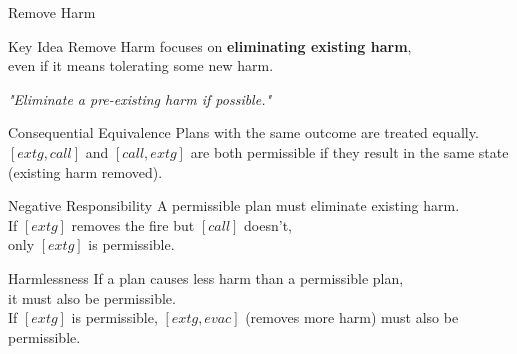 \documentclass[compress,xcolor=table]{beamer}
\begin{document}
\begin{frame}{Remove Harm}
    \begin{block}{Key Idea}
        Remove Harm focuses on \textbf{eliminating existing harm}, \\
        even if it means tolerating some new harm. \\
        \begin{center}
            \textit{"Eliminate a pre-existing harm if possible."}
        \end{center}
    \end{block}
    \tiny
    \begin{block}{Consequential Equivalence}
        Plans with the same outcome are treated equally.\\
        $[extg, call]$ and $[call, extg]$ are both permissible if they result in the same state (existing harm removed).
    \end{block}

    \begin{block}{Negative Responsibility}
        A permissible plan must eliminate existing harm.\\
        If $[extg]$ removes the fire but $[call]$ doesn't, \\
        only $[extg]$ is permissible.
    \end{block}

    \begin{block}{Harmlessness}
        If a plan causes less harm than a permissible plan, \\
        it must also be permissible.\\
        If $[extg]$ is permissible, $[extg, evac]$ (removes more harm) must also be permissible.
    \end{block}
\end{frame}
\end{document}
